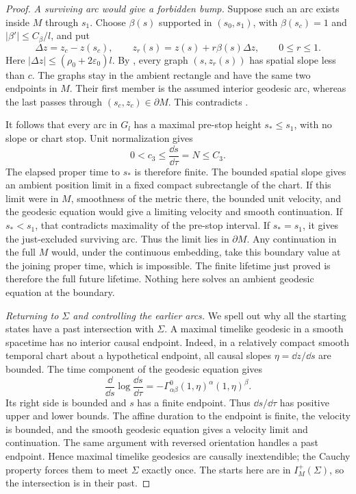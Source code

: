 \begin{proof}
\emph{A surviving arc would give a forbidden bump.}
Suppose such an arc exists inside $M$ through $s_1$.  Choose
$\beta(s)$ supported in $(s_0,s_1)$, with
$\beta(s_c)=1$ and $|\beta'|\le C_\beta/l$, and put
\[
 \Delta z=z_c-z(s_c),\qquad
 z_r(s)=z(s)+r\beta(s)\Delta z,\qquad 0\le r\le1.
\]
Here $|\Delta z|\le(\rho_0+2\varepsilon_0)l$.
By , every graph $(s,z_r(s))$ has
spatial slope less than $c$.  The graphs stay in the ambient
rectangle and have the same two endpoints in $M$.  Their
first member is the assumed interior geodesic arc, whereas
the last passes through $(s_c,z_c)\in\partial M$.
This contradicts .

It follows that every arc in $G_l$ has a maximal pre-stop
height $s_*\le s_1$, with no slope or chart stop.  Unit
normalization gives
\begin{equation}\label{ex:proper-time}
            0<c_3\le\frac{\dd s}{\dd\tau}=N\le C_3.
\end{equation}
The elapsed proper time to $s_*$ is therefore finite.  The
bounded spatial slope gives an ambient position limit in a
fixed compact subrectangle of the chart.  If this limit were
in $M$, smoothness of the metric there, the bounded unit
velocity, and the geodesic equation would give a limiting
velocity and smooth continuation.  If $s_*<s_1$, that
contradicts maximality of the pre-stop interval.  If
$s_*=s_1$, it gives the just-excluded surviving arc.
Thus the limit lies in $\partial M$.  Any continuation in
the full $M$ would, under the continuous embedding, take
this boundary value at the joining proper time, which is
impossible.  The finite lifetime just proved is therefore
the full future lifetime.  Nothing here solves an ambient
geodesic equation at the boundary.

\emph{Returning to $\Sigma$ and controlling the earlier arcs.}
We spell out why all the starting states have a past
intersection with $\Sigma$.  A maximal timelike geodesic in
a smooth spacetime has no interior causal endpoint.  Indeed,
in a relatively compact smooth temporal chart about a
hypothetical endpoint, all causal slopes $\eta=\dd z/\dd s$
are bounded.  The time component of the geodesic equation
gives
\[
  \frac{\dd}{\dd s}\log\frac{\dd s}{\dd\tau}
       =-\Gamma^0_{\alpha\beta}(1,\eta)^\alpha(1,\eta)^\beta.
\]
Its right side is bounded and $s$ has a finite endpoint.
Thus $\dd s/\dd\tau$ has positive upper and lower bounds.
The affine duration to the endpoint is finite, the velocity
is bounded, and the smooth geodesic equation gives a velocity
limit and continuation.  The same argument with reversed
orientation handles a past endpoint.  Hence maximal timelike
geodesics are causally inextendible; the Cauchy property
forces them to meet $\Sigma$ exactly once.  The starts here
are in $I_M^+(\Sigma)$, so the intersection is in their past.


\end{proof}
